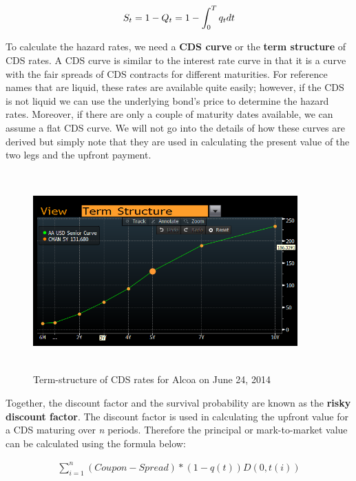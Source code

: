 \documentclass[article]{jss}
\begin{document}
\begin{displaymath}
S_t = 1 - Q_t = 1 - \int_0^T q_t dt\, \nonumber\\
\end{displaymath}

To calculate the hazard rates, we need a \textbf{CDS curve} or the \textbf{term structure} of CDS rates. A CDS curve is similar to the interest rate curve in that it is a curve with the fair spreads of CDS contracts for different maturities. For reference names that are liquid, these rates are available quite easily; however, if the CDS is not liquid we can use the underlying bond's price to determine the hazard rates. Moreover, if there are only a couple of maturity dates available, we can assume a flat CDS curve. We will not go into the details of how  these curves are derived but simply note that they are used in calculating the present value of the two legs and the upfront payment.

\begin{figure}[H]
\centering
\includegraphics[width=4in, height=3in]{images/CDScurve.png}
\caption{Term-structure of CDS rates for Alcoa on June 24, 2014}
\label{fig:CDScurveAlcoa}
\end{figure} 

Together, the discount factor and the survival probability are known as the \textbf{risky discount factor}. The discount factor is used in calculating the upfront value for a CDS maturing over \textit{n} periods. Therefore the principal or mark-to-market value can be calculated using the formula below:

\begin{equation}
 \begin{aligned}
   \displaystyle\sum_{i=1}^{n}(Coupon - Spread)*(1-q(t)) D(0, t(i))
    \end{aligned}
\end{equation}
\end{document}
